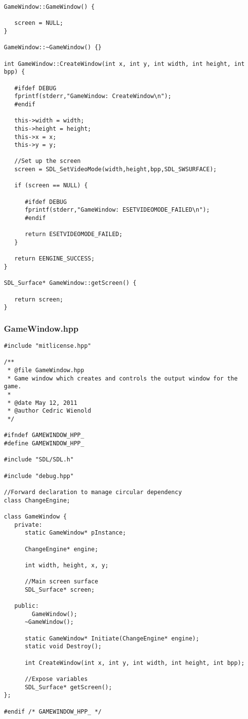 \documentclass[12pt]{article}
\begin{document}
\begin{lstlisting}[breaklines]
GameWindow::GameWindow() {

   screen = NULL;
}

GameWindow::~GameWindow() {}

int GameWindow::CreateWindow(int x, int y, int width, int height, int bpp) {

   #ifdef DEBUG
   fprintf(stderr,"GameWindow: CreateWindow\n");
   #endif
   
   this->width = width;
   this->height = height;
   this->x = x;
   this->y = y;

   //Set up the screen
   screen = SDL_SetVideoMode(width,height,bpp,SDL_SWSURFACE);

   if (screen == NULL) {

      #ifdef DEBUG
      fprintf(stderr,"GameWindow: ESETVIDEOMODE_FAILED\n");
      #endif
      
      return ESETVIDEOMODE_FAILED;
   }

   return EENGINE_SUCCESS;
}

SDL_Surface* GameWindow::getScreen() {

   return screen;
}

\end{lstlisting}
\subsubsection{GameWindow.hpp}
\begin{lstlisting}[breaklines]
#include "mitlicense.hpp"

/**
 * @file GameWindow.hpp
 * Game window which creates and controls the output window for the game.
 *
 * @date May 12, 2011
 * @author Cedric Wienold
 */

#ifndef GAMEWINDOW_HPP_
#define GAMEWINDOW_HPP_

#include "SDL/SDL.h"

#include "debug.hpp"

//Forward declaration to manage circular dependency
class ChangeEngine;

class GameWindow {
   private:
      static GameWindow* pInstance;

      ChangeEngine* engine;

      int width, height, x, y;

      //Main screen surface
      SDL_Surface* screen;

   public:
		GameWindow();
      ~GameWindow();

      static GameWindow* Initiate(ChangeEngine* engine);
      static void Destroy();

      int CreateWindow(int x, int y, int width, int height, int bpp);
      
      //Expose variables
      SDL_Surface* getScreen();
};

#endif /* GAMEWINDOW_HPP_ */

\end{lstlisting}
\end{document}
